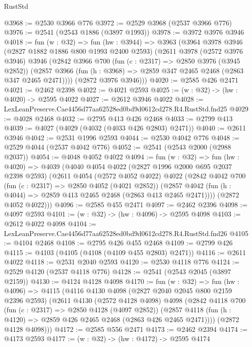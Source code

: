 \begin{lexlean}{RustStd}
\begin{coremodule}
@3968 := @2530 @3966 @776
@3972 := @2529 @3968 (@2537 @3966 @776)
@3976 := @2541 (@2543 @1886 (@3897 @1993))
@3978 := @3972 @3976 @3946
@4018 := fun (w : @32) =>
  fun (hw : @3944) =>
  @3963
    (@3964
      @3978
      @3946
      (@2827 @1882 @1886 @800 @1993 @2400 @2593)
      (@2611
        @3978
        (@2572 @3976 @3946)
        @3946
        (@2842
          @3966
          @700
          (fun (c : @2317) => @2850 @3976 (@3945 @2852))
          (@2857 @3966 (fun (h : @3968) => @2859 @347 @2465 @2468 (@2863 @347 @2465 @2471))))
        (@2872 @3976 @3946)))
@4020 := @2585 @426 @2471
@4021 := @2462 @2398
@4022 := @4021 @2593
@4025 := (w : @32) -> (hw : @4020) -> @2595 @4022
@4027 := @2612 @3946 @4022
@4028 := LexLeanPreserve.Cae4456d77aa62528ed0bd9d0612cd278.R4.RustStd.fnd25
@4029 := @4028 @2468
@4032 := @2795 @413 @426 @2468
@4033 := @2799 @413
@4039 := @4027 (@4029 (@4032 (@4033 @426 @2803) @2471))
@4040 := @2611 @3946
@4042 := @2531 @1996 @2593
@4044 := @2530 @4042 @776
@4048 := @2529 @4044 (@2537 @4042 @776)
@4052 := @2541 (@2543 @2000 (@2988 @2037))
@4054 := @4048 @4052 @4022
@4094 := fun (w : @32) =>
  fun (hw : @4020) =>
  @4039
    (@4040
      @4054
      @4022
      (@2827 @1996 @2000 @695 @2037 @2398 @2593)
      (@2611
        @4054
        (@2572 @4052 @4022)
        @4022
        (@2842
          @4042
          @700
          (fun (c : @2317) => @2850 @4052 (@4021 @2852))
          (@2857 @4042 (fun (h : @4044) => @2859 @413 @2465 @2468 (@2863 @413 @2465 @2471))))
        (@2872 @4052 @4022)))
@4096 := @2585 @455 @2471
@4097 := @2462 @2396
@4098 := @4097 @2593
@4101 := (w : @32) -> (hw : @4096) -> @2595 @4098
@4103 := @2612 @4022 @4098
@4104 := LexLeanPreserve.Cae4456d77aa62528ed0bd9d0612cd278.R4.RustStd.fnd26
@4105 := @4104 @2468
@4108 := @2795 @426 @455 @2468
@4109 := @2799 @426
@4115 := @4103 (@4105 (@4108 (@4109 @455 @2803) @2471))
@4116 := @2611 @4022
@4118 := @2531 @2040 @2593
@4120 := @2530 @4118 @776
@4124 := @2529 @4120 (@2537 @4118 @776)
@4128 := @2541 (@2543 @2045 (@3897 @2159))
@4130 := @4124 @4128 @4098
@4170 := fun (w : @32) =>
  fun (hw : @4096) =>
  @4115
    (@4116
      @4130
      @4098
      (@2827 @2040 @2045 @800 @2159 @2396 @2593)
      (@2611
        @4130
        (@2572 @4128 @4098)
        @4098
        (@2842
          @4118
          @700
          (fun (c : @2317) => @2850 @4128 (@4097 @2852))
          (@2857 @4118 (fun (h : @4120) => @2859 @426 @2465 @2468 (@2863 @426 @2465 @2471))))
        (@2872 @4128 @4098)))
@4172 := @2585 @556 @2471
@4173 := @2462 @2394
@4174 := @4173 @2593
@4177 := (w : @32) -> (hw : @4172) -> @2595 @4174

\end{coremodule}
\end{lexlean}
